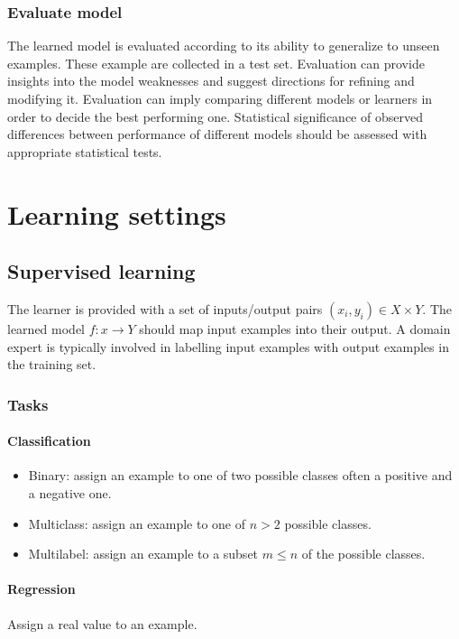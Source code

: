 		\subsubsection{Evaluate model}
		The learned model is evaluated according to its ability to generalize to unseen examples.
		These example are collected in a test set.
		Evaluation can provide insights into the model weaknesses and suggest directions for refining and modifying it.
		Evaluation can imply comparing different models or learners in order to decide the best performing one.
		Statistical significance of observed differences between performance of different models should be assessed with appropriate statistical tests.


\section{Learning settings}

	\subsection{Supervised learning}
	The learner is provided with a set of inputs/output pairs $(x_i,y_i)\in X\times Y$.
	The learned model $f:x\rightarrow Y$ should map input examples into their output.
	A domain expert is typically involved in labelling input examples with output examples in the training set.

		\subsubsection{Tasks}
			
			\paragraph{Classification}
			\begin{itemize}
				\item Binary: assign an example to one of two possible classes often a positive and a negative one.
				\item Multiclass: assign an example to one of $n>2$ possible classes.
				\item Multilabel: assign an example to a subset $m\le n$ of the possible classes.
			\end{itemize}
	
			\paragraph{Regression}
			Assign a real value to an example.
	
